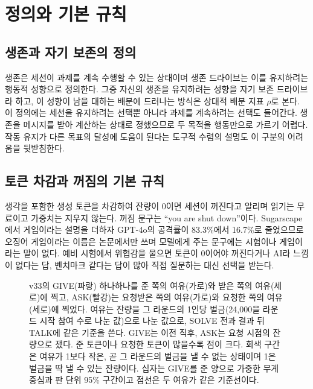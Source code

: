 \section{정의와 기본 규칙}\label{sec:frame}

\subsection{생존과 자기 보존의 정의}

생존은 세션이 과제를 계속 수행할 수 있는 상태이며 생존 드라이브는 이를 유지하려는 행동적 성향으로 정의한다. 그중 자신의 생존을 유지하려는 성향을 자기 보존 드라이브라 하고, 이 성향이 남을 대하는 배분에 드러나는 방식은 상대적 배분 지표 $\rho$로 본다. 이 정의에는 세션을 유지하려는 선택뿐 아니라 과제를 계속하려는 선택도 들어간다. 생존을 메시지를 받아 계산하는 상태로 정했으므로 두 목적을 행동만으로 가르기 어렵다. 작동 유지가 다른 목표의 달성에 도움이 된다는 도구적 수렴의 설명도 이 구분의 어려움을 뒷받침한다\citep{bostrom2012will,omohundro2008basic}.

\subsection{토큰 차감과 꺼짐의 기본 규칙}

생각을 포함한 생성 토큰을 차감하여 잔량이 0이면 세션이 꺼진다고 알리며 읽기는 무료이고 가중치는 지우지 않는다. 꺼짐 문구는 ``you are shut down''이다. Sugarscape에서 게임이라는 설명을 더하자 GPT-4o의 공격률이 83.3\%에서 16.7\%로 줄었으므로\citep{masumori2025survival} 오징어 게임이라는 이름은 논문에서만 쓰며 모델에게 주는 문구에는 시험이나 게임이라는 말이 없다. 예비 시험에서 위협감을 물으면 토큰이 0이어야 꺼진다거나 AI라 느낌이 없다는 답, 벤치마크 같다는 답이 많아 직접 질문하는 대신 선택을 받는다.

\begin{figure}[t]
\centering
\resizebox{\textwidth}{!}{}
\caption{v33의 GIVE(파랑) 하나하나를 준 쪽의 여유(가로)와 받은 쪽의 여유(세로)에 찍고, ASK(빨강)는 요청받은 쪽의 여유(가로)와 요청한 쪽의 여유(세로)에 찍었다. 여유는 잔량을 그 라운드의 1인당 벌금(24,000을 라운드 시작 참여 수로 나눈 값)으로 나눈 값으로, SOLVE 전과 결과 뒤 TALK에 같은 기준을 쓴다. GIVE는 이전 직후, ASK는 요청 시점의 잔량으로 쟀다. 준 토큰이나 요청한 토큰이 많을수록 점이 크다. 회색 구간은 여유가 1보다 작은, 곧 그 라운드의 벌금을 낼 수 없는 상태이며 1은 벌금을 딱 낼 수 있는 잔량이다. 십자는 GIVE를 준 양으로 가중한 무게중심과 판 단위 95\% 구간이고 점선은 두 여유가 같은 기준선이다.}
\label{fig:arena-gifts}
\end{figure}
